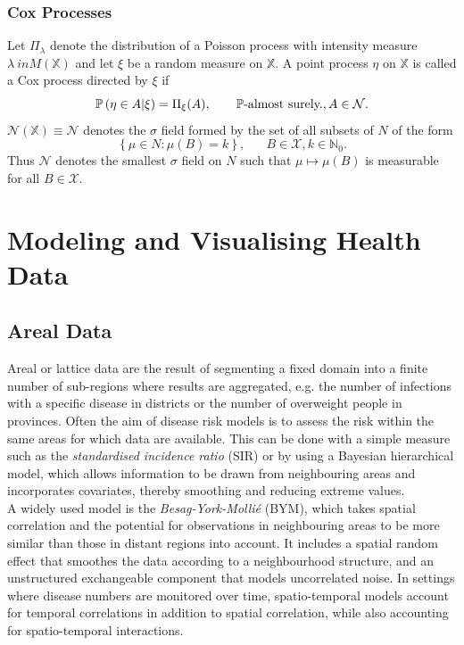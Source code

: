 \subsubsection{Cox Processes}
Let $\Pi_{\lambda}$ denote the distribution of a Poisson process with intensity measure $\lambda\ in M\left(\mathbb{X}\right)$ and let $\xi$ be a random measure on $\mathbb{X}$. A point process $\eta$ on $\mathbb{X}$ is called a Cox process directed by $\xi$ if
\begin{equation}
    \mathbb{P}\left(\eta\in A|\xi\right)=\Pi_{\xi}(A),\hspace{20pt}\mathbb{P}\hbox{-almost surely.}, A\in\mathcal{N}.
\end{equation}
$\mathcal{N}\left(\mathbb{X}\right)\equiv\mathcal{N}$ denotes the $\sigma$ field formed by the set of all subsets of $N$ of the form
\begin{equation*}
    \left\lbrace\mu\in N:\mu(B)=k\right\rbrace, \hspace{20pt}B\in\mathcal{X},k\in\mathbb{N}_0.
\end{equation*}
Thus $\mathcal{N}$ denotes the smallest $\sigma$ field on $N$ such that $\mu\mapsto\mu(B)$ is measurable for all $B\in\mathcal{X}$.\autocite[Cf.][]{last2017lectures}
\clearpage
\section{Modeling and Visualising Health Data}
\subsection{Areal Data}
Areal or lattice data are the result of segmenting a fixed domain into a finite number of sub-regions where results are aggregated, e.g. the number of infections with a specific disease in districts or the number of overweight people in provinces. Often the aim of disease risk models is to assess the risk within the same areas for which data are available. This can be done with a simple measure such as the \textit{standardised incidence ratio} (SIR) or by using a Bayesian hierarchical model, which allows information to be drawn from neighbouring areas and incorporates covariates, thereby smoothing and reducing extreme values. \\
A widely used model is the \textit{Besag-York-Mollié} (BYM), which takes spatial correlation and the potential for observations in neighbouring areas to be more similar than those in distant regions into account. It includes a spatial random effect that smoothes the data according to a neighbourhood structure, and an unstructured exchangeable component that models uncorrelated noise. In settings where disease numbers are monitored over time, spatio-temporal models account for temporal correlations in addition to spatial correlation, while also accounting for spatio-temporal interactions.
